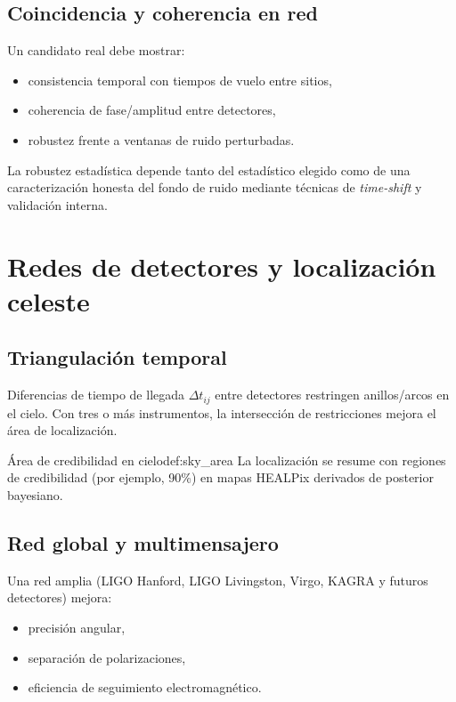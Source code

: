 \subsection{Coincidencia y coherencia en red}

Un candidato real debe mostrar:
\begin{itemize}[leftmargin=2em]
  \item consistencia temporal con tiempos de vuelo entre sitios,
  \item coherencia de fase/amplitud entre detectores,
  \item robustez frente a ventanas de ruido perturbadas.
\end{itemize}

\begin{importante}
La robustez estadística depende tanto del estadístico elegido como de una caracterización honesta del fondo de ruido mediante técnicas de \emph{time-shift} y validación interna.
\end{importante}

\section{Redes de detectores y localización celeste}
\label{sec:redes_localizacion}

\subsection{Triangulación temporal}

Diferencias de tiempo de llegada $\Delta t_{ij}$ entre detectores restringen anillos/arcos en el cielo. Con tres o más instrumentos, la intersección de restricciones mejora el área de localización.

\begin{definicion}{Área de credibilidad en cielo}{def:sky_area}
La localización se resume con regiones de credibilidad (por ejemplo, 90\%) en mapas HEALPix derivados de posterior bayesiano.
\end{definicion}

\subsection{Red global y multimensajero}

Una red amplia (LIGO Hanford, LIGO Livingston, Virgo, KAGRA y futuros detectores) mejora:
\begin{itemize}[leftmargin=2em]
  \item precisión angular,
  \item separación de polarizaciones,
  \item eficiencia de seguimiento electromagnético.
\end{itemize}

